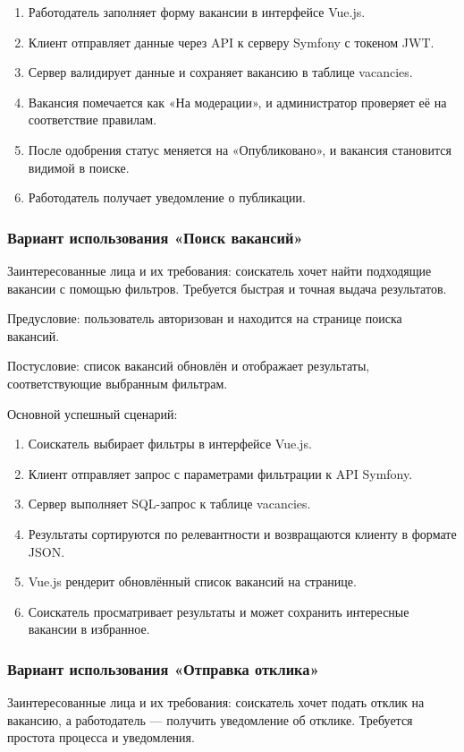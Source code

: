 \begin{enumerate}
	\item Работодатель заполняет форму вакансии в интерфейсе Vue.js.
	\item Клиент отправляет данные через API к серверу Symfony с токеном JWT.
	\item Сервер валидирует данные и сохраняет вакансию в таблице vacancies.
	\item Вакансия помечается как «На модерации», и администратор проверяет её на соответствие правилам.
	\item После одобрения статус меняется на «Опубликовано», и вакансия становится видимой в поиске.
	\item Работодатель получает уведомление о публикации.
\end{enumerate}

\subsubsection{Вариант использования «Поиск вакансий»}
Заинтересованные лица и их требования: соискатель хочет найти подходящие вакансии с помощью фильтров. Требуется быстрая и точная выдача результатов.

Предусловие: пользователь авторизован и находится на странице поиска вакансий.

Постусловие: список вакансий обновлён и отображает результаты, соответствующие выбранным фильтрам.

Основной успешный сценарий:

\begin{enumerate}
	\item Соискатель выбирает фильтры в интерфейсе Vue.js.
	\item Клиент отправляет запрос с параметрами фильтрации к API Symfony.
	\item Сервер выполняет SQL-запрос к таблице vacancies.
	\item Результаты сортируются по релевантности и возвращаются клиенту в формате JSON.
	\item Vue.js рендерит обновлённый список вакансий на странице.
	\item Соискатель просматривает результаты и может сохранить интересные вакансии в избранное.
\end{enumerate}

\subsubsection{Вариант использования «Отправка отклика»}
Заинтересованные лица и их требования: соискатель хочет подать отклик на вакансию, а работодатель — получить уведомление об отклике. Требуется простота процесса и уведомления.

